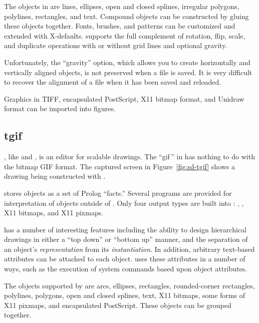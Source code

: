 \newpage
  The objects in  are lines, ellipses, open and closed
  splines, irregular polygons, polylines, rectangles, and text.
  Compound objects can be constructed by gluing these objects
  together.
  Fonts, brushes, and patterns can be customized and extended with
  X-defaults.   supports the full complement of 
  rotation, flip, scale, and duplicate operations with or without grid lines
  and optional gravity.

  Unfortunately, the ``gravity'' option, which allows you to create
  horizontally and vertically aligned objects, is not preserved when
  a file is saved.  It is very difficult to recover the alignment
  of a file when it has been saved and reloaded.

  Graphics in TIFF, encapsulated PostScript, X11 bitmap format,
  and Unidraw format can be imported into  figures.

\subsection{tgif}

  , like  and , is an
  editor for scalable drawings.  The ``gif\,'' in  has nothing
  to do with the bitmap GIF format.
  The captured screen in Figure~\ref{fig:sd-tgif} shows a drawing
  being constructed with .


   stores objects as a set of Prolog ``facts.''
  Several programs are provided for interpretation of 
  objects outside of .
  Only four output types are built into : ,
  , X11 bitmaps, and X11 pixmaps.

   has a number of interesting features including the ability
  to design hierarchical drawings in either a ``top down'' or ``bottom
  up'' manner, and the separation of an object's {\em representation}
  from its {\em instantiation}.  In addition, arbitrary text-based 
  attributes can be attached to each object.   uses these
  attributes in a number of ways, such as the execution
  of system commands based upon object attributes.

  The objects supported by  are arcs, ellipses,
  rectangles, rounded-corner rectangles, polylines, polygons, open and
  closed splines, text, X11 bitmaps, some forms of X11 pixmaps, and
  encapsulated PostScript.  These objects can be grouped together.

